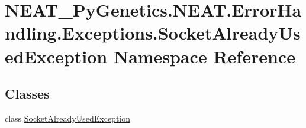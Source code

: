 \hypertarget{namespaceNEAT__PyGenetics_1_1NEAT_1_1ErrorHandling_1_1Exceptions_1_1SocketAlreadyUsedException}{}\section{N\+E\+A\+T\+\_\+\+Py\+Genetics.\+N\+E\+A\+T.\+Error\+Handling.\+Exceptions.\+Socket\+Already\+Used\+Exception Namespace Reference}
\label{namespaceNEAT__PyGenetics_1_1NEAT_1_1ErrorHandling_1_1Exceptions_1_1SocketAlreadyUsedException}
\subsection*{Classes}
\begin{DoxyCompactItemize}
\item 
class \hyperlink{classNEAT__PyGenetics_1_1NEAT_1_1ErrorHandling_1_1Exceptions_1_1SocketAlreadyUsedException_1_1SocketAlreadyUsedException}{Socket\+Already\+Used\+Exception}
\end{DoxyCompactItemize}
